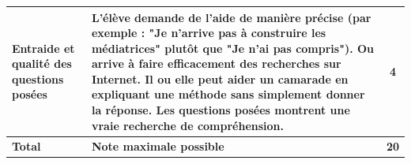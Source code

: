 \documentclass[answers]{exam}
\begin{document}
{\begin{longtable}{|L{0.3\textwidth}|L{0.7\textwidth}|c|}
  Entraide et qualité des questions posées
  & L'élève demande de l'aide de manière précise (par exemple : "Je n'arrive pas à construire les médiatrices" plutôt que "Je n'ai pas compris"). Ou arrive à faire efficacement des recherches sur Internet.
  Il ou elle peut aider un camarade en expliquant une méthode sans simplement donner la réponse.  
  Les questions posées montrent une vraie recherche de compréhension.
  & 4 \\
\hline

 \textbf{Total} & \textbf{Note maximale possible} & \textbf{20} \\
\hline

\end{longtable}
}
\end{document}
